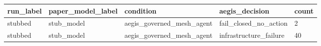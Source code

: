 \begin{tabular}{lllll}
 \hline
run\_label & paper\_model\_label & condition & aegis\_decision & count \\
 \hline
stubbed & stub\_model & aegis\_governed\_mesh\_agent & fail\_closed\_no\_action & 2 \\
stubbed & stub\_model & aegis\_governed\_mesh\_agent & infrastructure\_failure & 40 \\
 \hline
\end{tabular}
